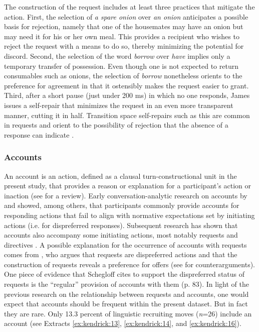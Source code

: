 \documentclass[output=paper,nonflat,modfont,draft]{langsci/langscibook}
\begin{document}
The construction of the request includes at least three practices that mitigate the action. First, the selection of \textit{a spare onion} over \textit{an onion} anticipates a possible basis for rejection, namely that one of the housemates may have an onion but may need it for his or her own meal. This provides a recipient who wishes to reject the request with a means to do so, thereby minimizing the potential for discord. Second, the selection of the word \textit{borrow} over \textit{have} implies only a temporary transfer of possession. Even though one is not expected to return consumables such as onions, the selection of \textit{borrow} nonetheless orients to the preference for agreement in that it ostensibly makes the request easier to grant. Third, after a short pause (just under 200 ms) in which no one responds, James issues a self-repair that minimizes the request in an even more transparent manner, cutting it in half. Transition space self-repairs such as this are common in requests and orient to the possibility of rejection that the absence of a response can indicate \citep{Davidson1984}.

\subsubsection{Accounts}
An account is an action, defined as a clausal turn-constructional unit in the present study, that provides a reason or explanation for a participant’s action or inaction (see \citealt{Robinson2016} for a review). Early conversation-analytic research on accounts by \citet{AtkinsonDrew1979} and \citet{heritage_garfinkel_1984} showed, among others,  that participants commonly provide accounts for responding actions that fail to align with normative expectations set by initiating actions (i.e. for dispreferred responses). Subsequent research has shown that accounts also accompany some initiating actions, most notably requests and directives \citep{Goodwin1990, HoutkoopSteenstra1990, Schegloff2007sequence, Raevaara2011, Parry2013, BaranovaDingemanse2016}. A possible explanation for the occurrence of accounts with requests comes from \citet{Schegloff2007sequence}, who argues that requests are dispreferred actions and that the construction of requests reveals a preference for offers (see \citealt{KendrickDrew2014} for counterarguments). One piece of evidence that Schegloff cites to support the dispreferred status of requests is the “regular” provision of accounts with them (p. 83). In light of the previous research on the relationship between requests and accounts, one would expect that accounts should be frequent within the present dataset. But in fact they are rare. Only 13.3 percent of linguistic recruiting moves (\textit{n}=26) include an account (see Extracts \ref{ex:kendrick:13}, \ref{ex:kendrick:14}, and \ref{ex:kendrick:16}).
\end{document}
